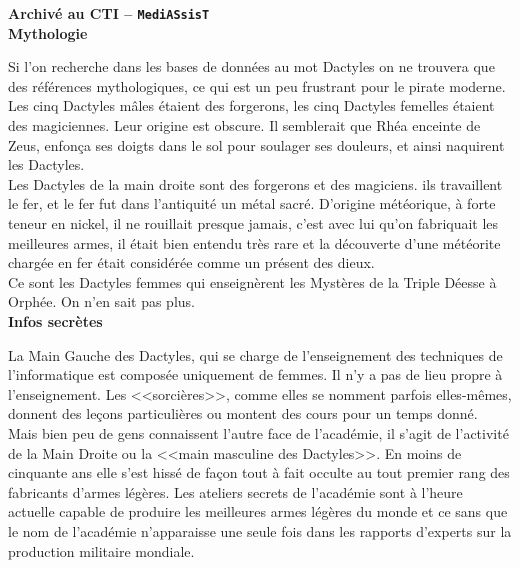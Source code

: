 \documentclass[11pt,twoside,a4paper]{article}
\begin{document}
\begin{multicols*}{3}
{\textbf{Archiv{\'e} au CTI -- \texttt{MediASsisT} }~\\

\textbf{Mythologie}

Si l'on recherche dans les bases de donn{\'e}es au mot Dactyles on ne trouvera que des r{\'e}f{\'e}rences mythologiques, ce qui est un peu frustrant pour le pirate moderne.                                  
Les cinq Dactyles m{\^a}les {\'e}taient des forgerons, les cinq Dactyles femelles {\'e}taient des magiciennes. Leur origine est obscure. Il semblerait que Rh{\'e}a enceinte de Zeus, enfon\c{c}a ses doigts dans le sol pour soulager ses douleurs, et ainsi naquirent les Dactyles.~\\

Les Dactyles de la main droite sont des forgerons et des magiciens. ils travaillent le fer, et le fer fut dans l'antiquit{\'e} un m{\'e}tal sacr{\'e}. D'origine m{\'e}t{\'e}orique, {\`a} forte teneur en nickel, il ne rouillait presque jamais, c'est avec lui qu'on fabriquait les meilleures armes, il {\'e}tait bien entendu tr{\`e}s rare et la d{\'e}couverte d'une m{\'e}t{\'e}orite charg{\'e}e en fer {\'e}tait consid{\'e}r{\'e}e comme un pr{\'e}sent des dieux.~\\

Ce sont les Dactyles femmes qui enseign{\`e}rent les Myst{\`e}res de la Triple D{\'e}esse {\`a} Orph{\'e}e. On n'en sait pas plus.~\\

\textbf{Infos secr{\`e}tes}

La Main Gauche des Dactyles, qui se charge de l'enseignement des techniques de l'informatique est compos{\'e}e uniquement de femmes. Il n'y a pas de lieu propre {\`a} l'enseignement. Les <<sorci{\`e}res>>, comme elles se nomment parfois elles-m{\^e}mes, donnent des le\c{c}ons particuli{\`e}res ou montent des cours pour un temps donn{\'e}.~\\

Mais bien peu de gens connaissent l'autre face de l'acad{\'e}mie, il s'agit de l'activit{\'e} de la Main Droite ou la <<main masculine des Dactyles>>. En moins de cinquante ans elle s'est hiss{\'e} de fa\c{c}on tout {\`a} fait occulte au tout premier rang des fabricants d'armes l{\'e}g{\`e}res. Les ateliers secrets de l'acad{\'e}mie sont {\`a} l'heure actuelle capable de produire les meilleures armes l{\'e}g{\`e}res du monde et ce sans que le nom de l'acad{\'e}mie n'apparaisse une seule fois dans les rapports d'experts sur la production militaire mondiale.~\\

}
\end{multicols*}
\end{document}
